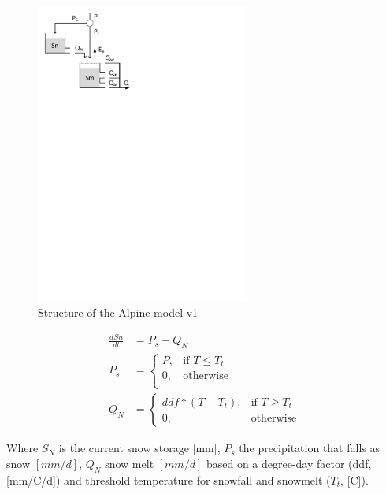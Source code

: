 { 																	%
\begin{figure}
\includegraphics[trim=1cm 21.5cm 9cm 1cm,width=7cm,keepaspectratio]{./AppA_files/12_schematic.pdf}
\caption{Structure of the Alpine model v1} \label{fig:12_schematic}
\end{figure}

\begin{align}
	\frac{dSn}{dt} &= P_s-Q_N \\
	P_s &= \begin{cases}
		P, &\text{if } T \leq T_t \\
		0, & \text{otherwise} \\
	\end{cases} \\
	Q_N &= 
	\begin{cases}
		ddf*(T - T_t), & \text{if } T \geq T_t \\
		0, & \text{otherwise}
	\end{cases}
\end{align}

Where $S_N$ is the current snow storage [mm], $P_s$ the precipitation that falls as snow $[mm/d]$, $Q_N$ snow melt $[mm/d]$ based on a degree-day factor (ddf, [mm/\degree C/d]) and threshold temperature for snowfall and snowmelt ($T_t$, [\degree C]).

}

